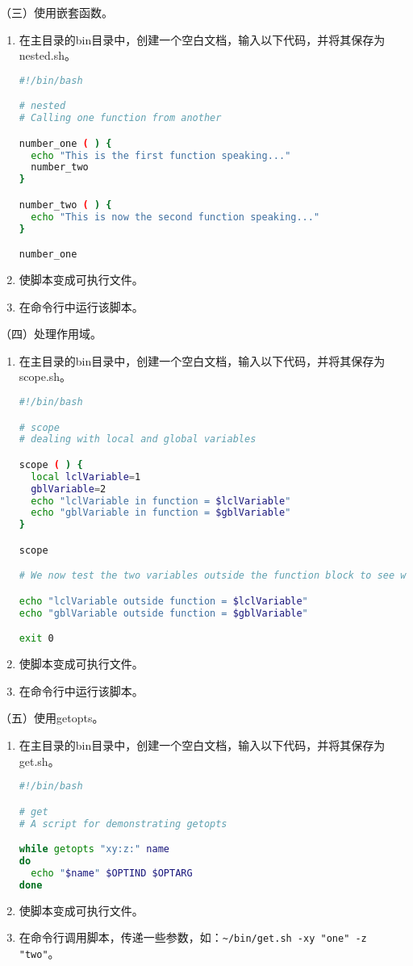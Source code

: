 \vspace{0.1in}
（三）使用嵌套函数。
\begin{enumerate}
  \item 在主目录的bin目录中，创建一个空白文档，输入以下代码，并将其保存为nested.sh。
\begin{lstlisting}[language=bash]
#!/bin/bash

# nested
# Calling one function from another

number_one ( ) {
  echo "This is the first function speaking..."
  number_two
}

number_two ( ) {
  echo "This is now the second function speaking..."
}

number_one
\end{lstlisting}
  \item 使脚本变成可执行文件。
  \item 在命令行中运行该脚本。
\end{enumerate}

\vspace{0.1in}
（四）处理作用域。
\begin{enumerate}
  \item 在主目录的bin目录中，创建一个空白文档，输入以下代码，并将其保存为scope.sh。
\begin{lstlisting}[language=bash]
#!/bin/bash

# scope
# dealing with local and global variables

scope ( ) {
  local lclVariable=1
  gblVariable=2
  echo "lclVariable in function = $lclVariable"
  echo "gblVariable in function = $gblVariable"
}

scope

# We now test the two variables outside the function block to see what happens

echo "lclVariable outside function = $lclVariable"
echo "gblVariable outside function = $gblVariable"

exit 0
\end{lstlisting}
  \item 使脚本变成可执行文件。
  \item 在命令行中运行该脚本。
\end{enumerate}

\vspace{0.1in}
（五）使用getopts。
\begin{enumerate}
  \item 在主目录的bin目录中，创建一个空白文档，输入以下代码，并将其保存为get.sh。
\begin{lstlisting}[language=bash]
#!/bin/bash

# get
# A script for demonstrating getopts

while getopts "xy:z:" name
do
  echo "$name" $OPTIND $OPTARG
done
\end{lstlisting}
  \item 使脚本变成可执行文件。
  \item 在命令行调用脚本，传递一些参数，如：\verb|~/bin/get.sh -xy "one" -z "two"|。
\end{enumerate}

